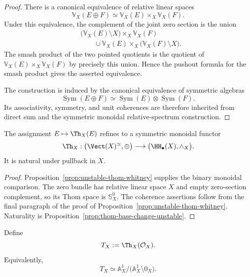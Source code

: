 \begin{proof}
There is a canonical equivalence of relative linear spaces
\[
    \mathbb V_X(E\oplus F)
    \simeq
    \mathbb V_X(E)\times_X\mathbb V_X(F).
\]
Under this equivalence, the complement of the joint zero section is the union
\[
\begin{aligned}
    &\bigl(\mathbb V_X(E)\setminus X\bigr)
        \times_X\mathbb V_X(F) \\
    &\qquad\cup
    \mathbb V_X(E)\times_X
        \bigl(\mathbb V_X(F)\setminus X\bigr).
\end{aligned}
\]
The smash product of the two pointed quotients is the quotient of
$\mathbb V_X(E)\times_X\mathbb V_X(F)$ by precisely this union.  Hence the pushout formula for the
smash product gives the asserted equivalence.

The construction is induced by the canonical equivalence of symmetric algebras
\[
    \operatorname{Sym}(E\oplus F)
    \simeq
    \operatorname{Sym}(E)\otimes\operatorname{Sym}(F).
\]
Its associativity, symmetry, and unit coherences are therefore inherited from direct sum and the
symmetric monoidal relative-spectrum construction.
\end{proof}

\begin{corollary}
\label{cor:unstable-thom-functor}
The assignment $E\mapsto\Th_X(E)$ refines to a symmetric monoidal functor
\[
    \Th_X:
    \bigl(\Vect(X)^\simeq,\oplus\bigr)
    \longrightarrow
    \bigl(\HH_\bullet(X),\wedge_X\bigr).
\]
It is natural under pullback in $X$.
\end{corollary}

\begin{proof}
Proposition~\ref{prop:unstable-thom-whitney} supplies the binary monoidal comparison.  The zero
bundle has relative linear space $X$ and empty zero-section complement, so its Thom space is
$\mathbb S^0_X$.  The coherence assertions follow from the final paragraph of the proof of
Proposition~\ref{prop:unstable-thom-whitney}.  Naturality is
Proposition~\ref{prop:thom-base-change-unstable}.
\end{proof}

\begin{definition}
\label{def:T-sphere}
Define
\[
    T_X
    :=
    \Th_X(\mathcal O_X).
\]
Equivalently,
\[
    T_X
    \simeq
    \mathbb A^1_X/\bigl(\mathbb A^1_X\setminus0_X\bigr).
\]
\end{definition}

